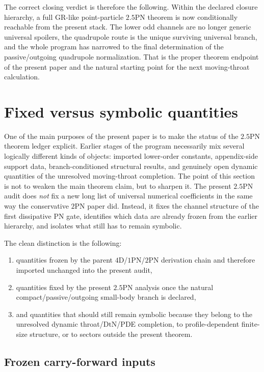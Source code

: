 \documentclass[11pt]{article}
\begin{document}
The correct closing verdict is therefore the following.  Within the declared
closure hierarchy, a full GR-like point-particle $2.5$PN theorem is now
conditionally reachable from the present stack.  The lower odd channels are no
longer generic universal spoilers, the quadrupole route is the unique surviving
universal branch, and the whole program has narrowed to the final determination
of the passive/outgoing quadrupole normalization.  That is the proper theorem
endpoint of the present paper and the natural starting point for the next
moving-throat calculation.

\section{Fixed versus symbolic quantities}
\label{sec:fixed-vs-symbolic}

One of the main purposes of the present paper is to make the status of the
$2.5$PN theorem ledger explicit.  Earlier stages of the program necessarily mix
several logically different kinds of objects: imported lower-order constants,
appendix-side support data, branch-conditioned structural results, and genuinely
open dynamic quantities of the unresolved moving-throat completion.  The point of
this section is not to weaken the main theorem claim, but to sharpen it.  The
present $2.5$PN audit does \emph{not} fix a new long list of universal
numerical coefficients in the same way the conservative $2$PN paper did.
Instead, it fixes the channel structure of the first dissipative PN gate,
identifies which data are already frozen from the earlier hierarchy, and isolates
what still has to remain symbolic.

The clean distinction is the following:
\begin{enumerate}
  \item quantities frozen by the parent $4$D/$1$PN/$2$PN derivation chain and
  therefore imported unchanged into the present audit,
  \item quantities fixed by the present $2.5$PN analysis once the natural
  compact/passive/outgoing small-body branch is declared,
  \item and quantities that should still remain symbolic because they belong to
  the unresolved dynamic throat/\(\mathrm{DtN}\)/PDE completion, to
  profile-dependent finite-size structure, or to sectors outside the present
  theorem.
\end{enumerate}

\subsection{Frozen carry-forward inputs}
\label{sec:fixed-vs-symbolic-carried}
\end{document}
